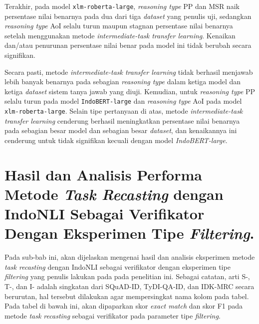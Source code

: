 Terakhir, pada model \texttt{xlm-roberta-large}, \emph{reasoning type} PP dan MSR naik persentase nilai benarnya pada dua dari tiga \emph{dataset} yang penulis uji, sedangkan \emph{reasoning type} AoI selalu turun maupun stagnan persentase nilai benarnya setelah menggunakan metode \emph{intermediate-task transfer learning}. Kenaikan dan/atau penurunan persentase nilai benar pada model ini tidak berubah secara signifikan.

Secara pasti, metode \emph{intermediate-task transfer learning} tidak berhasil menjawab lebih banyak benarnya pada sebagian \emph{reasoning type} dalam ketiga model dan ketiga \emph{dataset} sistem tanya jawab yang diuji. Kemudian, untuk \emph{reasoning type} PP selalu turun pada model \texttt{IndoBERT-large} dan \emph{reasoning type} AoI pada model \texttt{xlm-roberta-large}. Selain tipe pertanyaan di atas, metode \emph{intermediate-task transfer learning} cenderung berhasil meningkatkan persentase nilai benarnya pada sebagian besar model dan sebagian besar \emph{dataset}, dan kenaikannya ini cenderung untuk tidak signifikan kecuali dengan model \emph{IndoBERT-large}. 

\section{Hasil dan Analisis Performa Metode \emph{Task Recasting} dengan IndoNLI Sebagai Verifikator Dengan Eksperimen Tipe \emph{Filtering}.}
\label{5.4}
Pada sub-bab ini, akan dijelaskan mengenai hasil dan analisis eksperimen metode \emph{task recasting} dengan IndoNLI sebagai verifikator dengan eksperimen tipe \emph{filtering} yang penulis lakukan pada pada penelitian ini. Sebagai catatan, arti S-, T-, dan I- adalah singkatan dari SQuAD-ID, TyDI-QA-ID, dan IDK-MRC secara berurutan, hal tersebut dilakukan agar mempersingkat nama kolom pada tabel. Pada tabel di bawah ini, akan dipaparkan skor \emph{exact match} dan skor F1 pada metode \emph{task recasting} sebagai verifikator pada parameter tipe \emph{filtering}.

